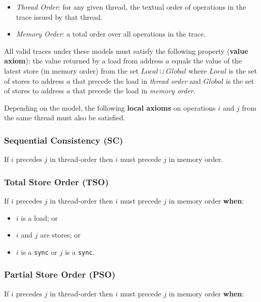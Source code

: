 \documentclass[11pt]{article}
\begin{document}
\begin{itemize}

\item
\emph{Thread Order}: for any given thread, the textual order of
operations in the trace issued by that thread.

\item
\emph{Memory Order}: a total order over all operations in the trace.

\end{itemize}

All valid traces under these models must satisfy the following
property (\textbf{value axiom}): the value returned by a load from
address $a$ equals the value of the latest store (in memory
order) from the set $Local \cup Global$ where $Local$ is the set of
stores to address $a$ that precede the load in \emph{thread order}
and $Global$ is the set of stores to address $a$ that precede the load
in \emph{memory order}.

Depending on the model, the following \textbf{local axioms} on
operations $i$ and $j$ from the same thread must also be satisfied.

\subsubsection*{Sequential Consistency (SC)}

If $i$ precedes $j$ in thread-order then $i$ must precede
$j$ in memory order.

\subsubsection*{Total Store Order (TSO)}

If $i$ precedes $j$ in thread-order then $i$ must precede
$j$ in memory order \textbf{when}:

\begin{itemize}
\item $i$ is a load; or
\item $i$ and $j$ are stores; or
\item $i$ is a \verb!sync! or $j$ is a \verb!sync!.
\end{itemize}

\subsubsection*{Partial Store Order (PSO)}

If $i$ precedes $j$ in thread-order then $i$ must precede
$j$ in memory order \textbf{when}:
\end{document}
